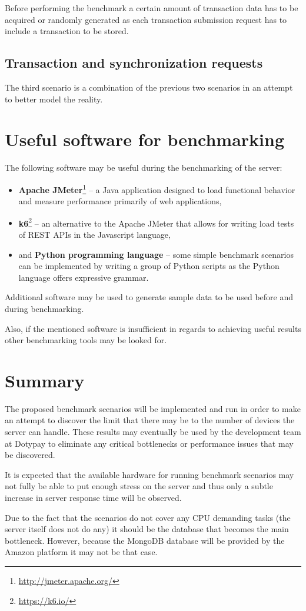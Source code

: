 \documentclass[12pt, a4paper]{article}
\let\oldsection\section
\renewcommand\section{\clearpage\oldsection}
\begin{document}
Before performing the benchmark a certain amount of transaction data has to be acquired or randomly generated as each transaction submission request has to include a transaction to be stored. 

\subsection{Transaction and synchronization requests}
The third scenario is a combination of the previous two scenarios in an attempt to better model the reality. 

\section{Useful software for benchmarking}
The following software may be useful during the benchmarking of the server:

\begin{itemize}
   \item \textbf{Apache JMeter}\footnote{\url{http://jmeter.apache.org/}} -- a Java application designed to load functional behavior and measure performance primarily of web applications,
   \item \textbf{k6}\footnote{\url{https://k6.io/}} -- an alternative to the Apache JMeter that allows for writing load tests of REST APIs in the Javascript language,
   \item and \textbf{Python programming language} -- some simple benchmark scenarios can be implemented by writing a group of Python scripts as the Python language offers expressive grammar.
\end{itemize}

Additional software may be used to generate sample data to be used before and during benchmarking.

Also, if the mentioned software is insufficient in regards to achieving useful results other benchmarking tools may be looked for.

\section{Summary}
The proposed benchmark scenarios will be implemented and run in order to make an attempt to discover the limit that there may be to the number of devices the server can handle. 
These results may eventually be used by the development team at Dotypay to eliminate any critical bottlenecks or performance issues that may be discovered.

It is expected that the available hardware for running benchmark scenarios may not fully be able to put enough stress on the server and thus only a subtle increase in server response time will be observed.

Due to the fact that the scenarios do not cover any CPU demanding tasks (the server itself does not do any) it should be the database that becomes the main bottleneck. However, because the MongoDB database will be provided by the Amazon platform it may not be that case.
\end{document}
